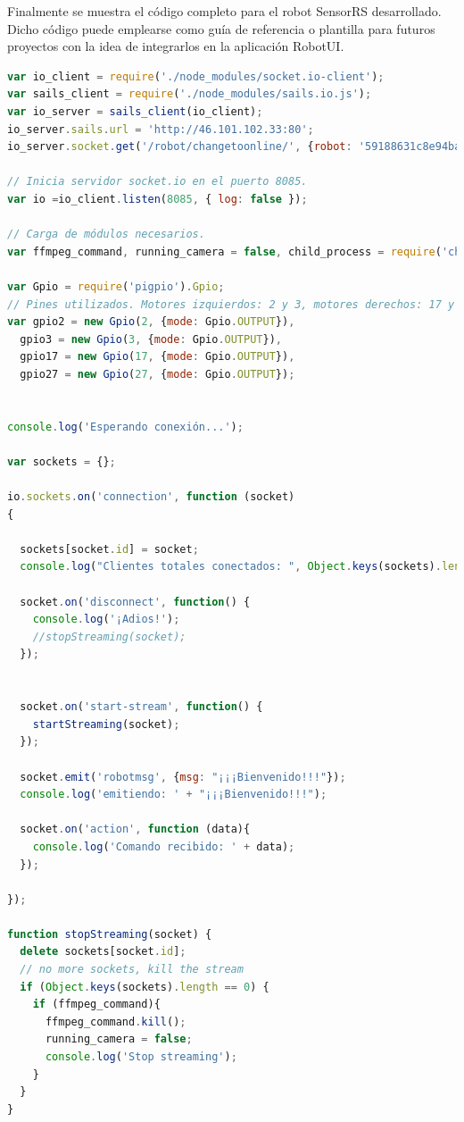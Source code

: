 Finalmente se muestra el código completo para el robot SensorRS desarrollado. Dicho código puede emplearse como guía de referencia o plantilla para futuros proyectos con la idea de integrarlos en la aplicación RobotUI.\\

\begin{lstlisting}[language=JavaScript]
var io_client = require('./node_modules/socket.io-client');
var sails_client = require('./node_modules/sails.io.js');
var io_server = sails_client(io_client);
io_server.sails.url = 'http://46.101.102.33:80';
io_server.socket.get('/robot/changetoonline/', {robot: '59188631c8e94ba54f7a4bdc', online: true});

// Inicia servidor socket.io en el puerto 8085.
var io =io_client.listen(8085, { log: false });

// Carga de módulos necesarios.
var ffmpeg_command, running_camera = false, child_process = require('child_process');

var Gpio = require('pigpio').Gpio;
// Pines utilizados. Motores izquierdos: 2 y 3, motores derechos: 17 y 27 en caso de conectarlos a la Raspberry Pi.
var gpio2 = new Gpio(2, {mode: Gpio.OUTPUT}),
  gpio3 = new Gpio(3, {mode: Gpio.OUTPUT}),
  gpio17 = new Gpio(17, {mode: Gpio.OUTPUT}),
  gpio27 = new Gpio(27, {mode: Gpio.OUTPUT});


console.log('Esperando conexión...');

var sockets = {};

io.sockets.on('connection', function (socket)
{

  sockets[socket.id] = socket;
  console.log("Clientes totales conectados: ", Object.keys(sockets).length);

  socket.on('disconnect', function() {
    console.log('¡Adios!');
    //stopStreaming(socket);
  });


  socket.on('start-stream', function() {
    startStreaming(socket);
  });

  socket.emit('robotmsg', {msg: "¡¡¡Bienvenido!!!"});
  console.log('emitiendo: ' + "¡¡¡Bienvenido!!!");

  socket.on('action', function (data){
    console.log('Comando recibido: ' + data);
  });
  
});

function stopStreaming(socket) {
  delete sockets[socket.id];
  // no more sockets, kill the stream
  if (Object.keys(sockets).length == 0) {
    if (ffmpeg_command){
      ffmpeg_command.kill();
      running_camera = false;
      console.log('Stop streaming');
    }
  }
}


\end{lstlisting}
